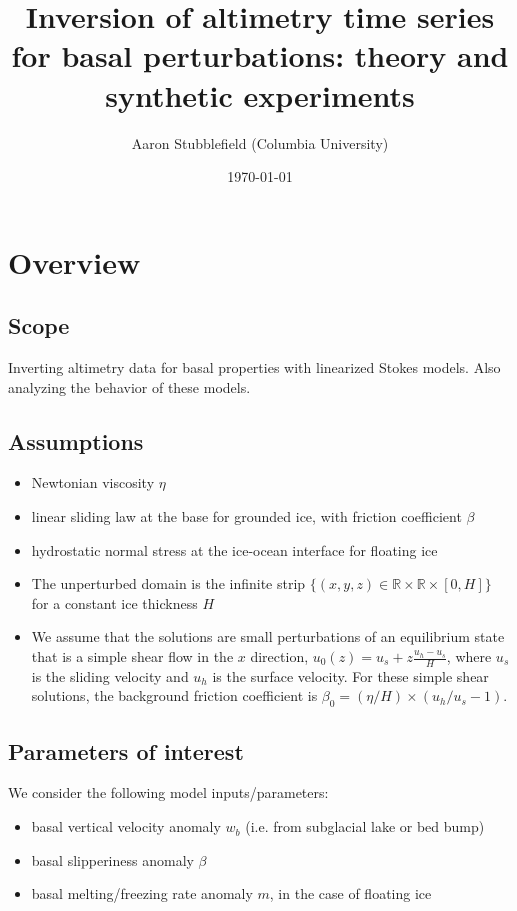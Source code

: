 \documentclass[paper=a4, fontsize=11pt]{article}
\title{
Inversion of altimetry time series for basal perturbations: theory
and synthetic experiments
}
\author{Aaron Stubblefield (Columbia University)} %
\date{\small\today} %
\begin{document}
\maketitle %

\section*{Overview}
\subsection*{Scope}
Inverting altimetry data for basal properties with linearized Stokes models.
Also analyzing the behavior of these models.

\subsection*{Assumptions}
\begin{itemize}
\item Newtonian viscosity $\eta$
\item linear sliding law at the base for grounded ice, with friction coefficient $\beta$
\item hydrostatic normal stress at the ice-ocean interface for floating ice
\item The unperturbed domain is the infinite strip $\{(x,y,z)\in\mathbb{R}\times\mathbb{R}\times[0,H]\}$ for a
constant ice thickness $H$
\item We assume that the solutions are small perturbations of an equilibrium state
that is a simple shear flow in the $x$ direction, $u_0(z) = u_s + z\frac{u_h-u_s}{H} $,
where $u_s$ is the sliding velocity and $u_h$ is the surface velocity.
For these simple shear solutions, the background friction coefficient is $\beta_0 = (\eta/H)\times(u_h/u_s - 1)$.
\end{itemize}

\subsection*{Parameters of interest}
We consider the following model inputs/parameters:
\begin{itemize}
\item basal vertical velocity anomaly $w_b$ (i.e. from subglacial lake or bed bump)
\item basal slipperiness anomaly $\beta$
\item basal melting/freezing rate anomaly $m$, in the case of floating ice
\end{itemize}
\end{document}
